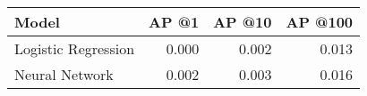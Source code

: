 
\begin{tabular}{lrrr}
\toprule
\textbf{Model}     & \textbf{AP @1} & \textbf{AP @10} & \textbf{AP @100} \\
\midrule
Logistic Regression & 0.000 & 0.002 & 0.013 \\
Neural Network & 0.002 & 0.003 & 0.016 \\
\bottomrule
\end{tabular}